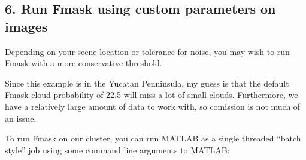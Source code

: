 \documentclass{article}
\begin{document}
    \subsection{6. Run Fmask using custom parameters on images}

Depending on your scene location or tolerance for noise, you may wish to
run Fmask with a more conservative threshold.

Since this example is in the Yucatan Penninsula, my guess is that the
default Fmask cloud probability of 22.5 will miss a lot of small clouds.
Furthermore, we have a relatively large amount of data to work with, so
comission is not much of an issue.

To run Fmask on our cluster, you can run MATLAB as a single threaded
``batch style'' job using some command line arguments to MATLAB:
\end{document}
